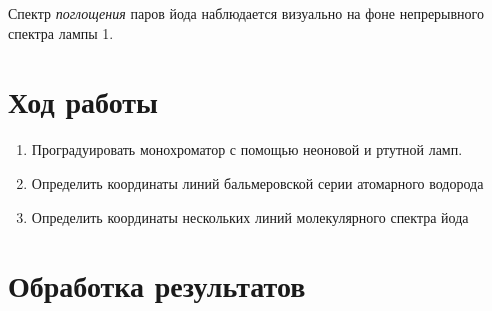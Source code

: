 \documentclass[12pt,a4paper]{article}
\begin{document}
Спектр \textit{поглощения} паров йода наблюдается визуально на фоне непрерывного спектра лампы 1.

\section{Ход работы}

\begin{enumerate}
\item Проградуировать монохроматор с помощью неоновой и ртутной ламп.
\item Определить координаты линий бальмеровской серии атомарного водорода
\item Определить координаты нескольких линий молекулярного спектра йода
\end{enumerate}

\section{Обработка результатов}
\end{document}
